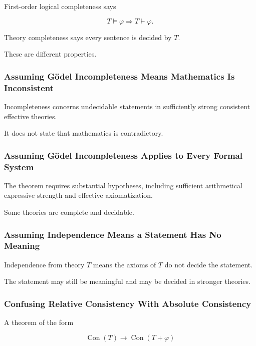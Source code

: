 First-order logical completeness says

\[
T\models\varphi
\Rightarrow
T\vdash\varphi.
\]

Theory completeness says every sentence is decided by \(T\).

These are different properties.

\subsubsection{Assuming Gödel Incompleteness Means Mathematics Is Inconsistent}

Incompleteness concerns undecidable statements in sufficiently strong
consistent effective theories.

It does not state that mathematics is contradictory.

\subsubsection{Assuming Gödel Incompleteness Applies to Every Formal System}

The theorem requires substantial hypotheses, including sufficient
arithmetical expressive strength and effective axiomatization.

Some theories are complete and decidable.

\subsubsection{Assuming Independence Means a Statement Has No Meaning}

Independence from theory \(T\) means the axioms of \(T\) do not decide the
statement.

The statement may still be meaningful and may be decided in stronger
theories.

\subsubsection{Confusing Relative Consistency With Absolute Consistency}

A theorem of the form

\[
\operatorname{Con}(T)
\rightarrow
\operatorname{Con}(T+\varphi)
\]

